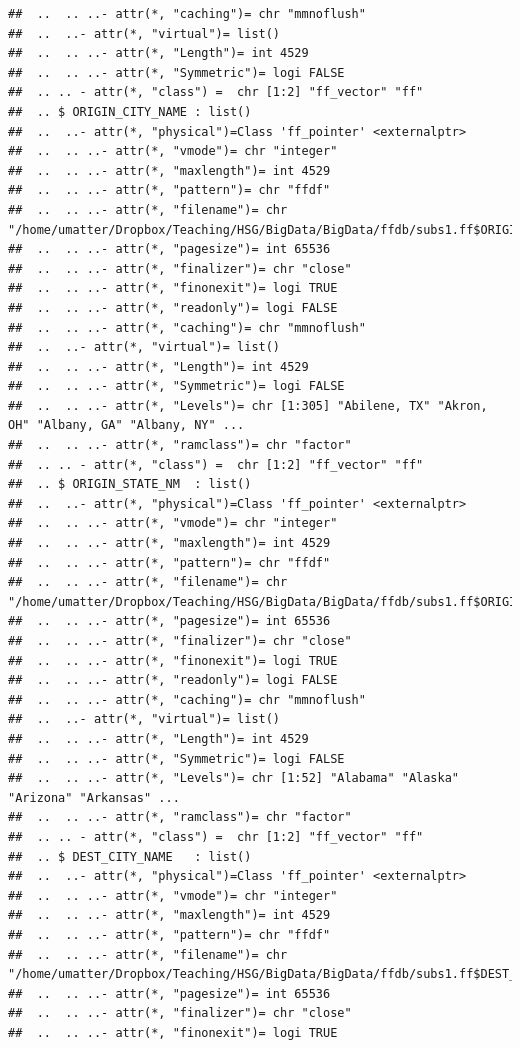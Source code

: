 \documentclass[
  12pt,
]{style/krantz}
\begin{document}
\begin{verbatim}
##  ..  .. ..- attr(*, "caching")= chr "mmnoflush"
##  ..  ..- attr(*, "virtual")= list()
##  ..  .. ..- attr(*, "Length")= int 4529
##  ..  .. ..- attr(*, "Symmetric")= logi FALSE
##  .. .. - attr(*, "class") =  chr [1:2] "ff_vector" "ff"
##  .. $ ORIGIN_CITY_NAME : list()
##  ..  ..- attr(*, "physical")=Class 'ff_pointer' <externalptr> 
##  ..  .. ..- attr(*, "vmode")= chr "integer"
##  ..  .. ..- attr(*, "maxlength")= int 4529
##  ..  .. ..- attr(*, "pattern")= chr "ffdf"
##  ..  .. ..- attr(*, "filename")= chr "/home/umatter/Dropbox/Teaching/HSG/BigData/BigData/ffdb/subs1.ff$ORIGIN_CITY_NAME.ff"
##  ..  .. ..- attr(*, "pagesize")= int 65536
##  ..  .. ..- attr(*, "finalizer")= chr "close"
##  ..  .. ..- attr(*, "finonexit")= logi TRUE
##  ..  .. ..- attr(*, "readonly")= logi FALSE
##  ..  .. ..- attr(*, "caching")= chr "mmnoflush"
##  ..  ..- attr(*, "virtual")= list()
##  ..  .. ..- attr(*, "Length")= int 4529
##  ..  .. ..- attr(*, "Symmetric")= logi FALSE
##  ..  .. ..- attr(*, "Levels")= chr [1:305] "Abilene, TX" "Akron, OH" "Albany, GA" "Albany, NY" ...
##  ..  .. ..- attr(*, "ramclass")= chr "factor"
##  .. .. - attr(*, "class") =  chr [1:2] "ff_vector" "ff"
##  .. $ ORIGIN_STATE_NM  : list()
##  ..  ..- attr(*, "physical")=Class 'ff_pointer' <externalptr> 
##  ..  .. ..- attr(*, "vmode")= chr "integer"
##  ..  .. ..- attr(*, "maxlength")= int 4529
##  ..  .. ..- attr(*, "pattern")= chr "ffdf"
##  ..  .. ..- attr(*, "filename")= chr "/home/umatter/Dropbox/Teaching/HSG/BigData/BigData/ffdb/subs1.ff$ORIGIN_STATE_NM.ff"
##  ..  .. ..- attr(*, "pagesize")= int 65536
##  ..  .. ..- attr(*, "finalizer")= chr "close"
##  ..  .. ..- attr(*, "finonexit")= logi TRUE
##  ..  .. ..- attr(*, "readonly")= logi FALSE
##  ..  .. ..- attr(*, "caching")= chr "mmnoflush"
##  ..  ..- attr(*, "virtual")= list()
##  ..  .. ..- attr(*, "Length")= int 4529
##  ..  .. ..- attr(*, "Symmetric")= logi FALSE
##  ..  .. ..- attr(*, "Levels")= chr [1:52] "Alabama" "Alaska" "Arizona" "Arkansas" ...
##  ..  .. ..- attr(*, "ramclass")= chr "factor"
##  .. .. - attr(*, "class") =  chr [1:2] "ff_vector" "ff"
##  .. $ DEST_CITY_NAME   : list()
##  ..  ..- attr(*, "physical")=Class 'ff_pointer' <externalptr> 
##  ..  .. ..- attr(*, "vmode")= chr "integer"
##  ..  .. ..- attr(*, "maxlength")= int 4529
##  ..  .. ..- attr(*, "pattern")= chr "ffdf"
##  ..  .. ..- attr(*, "filename")= chr "/home/umatter/Dropbox/Teaching/HSG/BigData/BigData/ffdb/subs1.ff$DEST_CITY_NAME.ff"
##  ..  .. ..- attr(*, "pagesize")= int 65536
##  ..  .. ..- attr(*, "finalizer")= chr "close"
##  ..  .. ..- attr(*, "finonexit")= logi TRUE

\end{verbatim}
\end{document}

